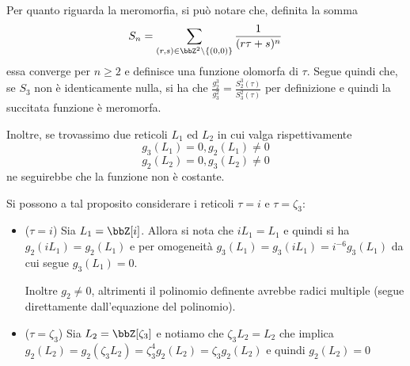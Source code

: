 Per quanto riguarda la meromorfia, si può notare che, definita la somma
$$S_n = \sum_{(r, s) \in \bbZ^2 \setminus \{(0, 0)\}} \frac{1}{(r \tau
  + s)^n}$$ essa converge per $n \ge 2$ e definisce una funzione olomorfa
di $\tau$. Segue quindi che, se $S_3$ non è identicamente nulla, si ha
che $\frac{g_2^3}{g_3^2} = \frac{S_2^3(\tau)}{S_3^2(\tau)}$ per
definizione e quindi la succitata funzione è meromorfa.


Inoltre, se trovassimo due reticoli $L_1$ ed $L_2$ in cui valga
rispettivamente
$$g_3(L_1) = 0, g_2(L_1) \neq 0$$
$$g_2(L_2) = 0, g_3(L_2) \neq 0$$
ne seguirebbe che la funzione non è costante.

Si possono a tal proposito considerare i reticoli $\tau = i$ e
$\tau = \zeta_3$:
\begin{itemize}
\item ($\tau = i$) Sia $L_1 = \bbZ[i]$. Allora si nota che $i L_1 = L_1$
  e quindi si ha $g_2(i L_1) = g_2(L_1)$ e per omogeneità
  $g_3(L_1) = g_3(i L_1) = i^{-6} g_3(L_1)$ da cui segue $g_3(L_1) = 0$.

  Inoltre $g_2 \neq 0$, altrimenti il polinomio definente avrebbe radici
  multiple (segue direttamente dall'equazione del polinomio).

\item ($\tau = \zeta_3$) Sia $L_2 = \bbZ[\zeta_3]$ e notiamo che
  $\zeta_3 L_2 = L_2$ che implica $g_2(L_2) = g_2(\zeta_3 L_2) =
  \zeta_3^4 g_2(L_2) = \zeta_3 g_2(L_2)$ e quindi $g_2(L_2) = 0$
\end{itemize}

